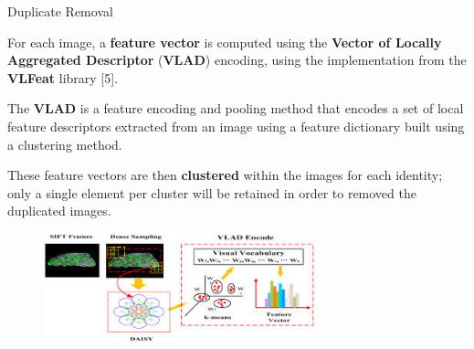 \begin{tframe}{Duplicate Removal}

For each image, a \textbf{feature vector} is computed using the \textbf{Vector of Locally Aggregated Descriptor} (\textbf{VLAD}) encoding, using the implementation from the \textbf{VLFeat} library [5]. 

\vspace{0.1in}

The \textbf{VLAD} is a feature encoding and pooling method that encodes a set of local feature descriptors extracted from an image using a feature dictionary built using a clustering method. 

\vspace{0.1in}

These feature vectors are then \textbf{clustered} within the images for each identity; only a single element per cluster will be retained in order to removed the duplicated images.

\begin{figure}[h]
\begin{center}
\includegraphics[width=0.7\textwidth]{images/image7.jpg}
\end{center}
\end{figure}


\end{tframe}